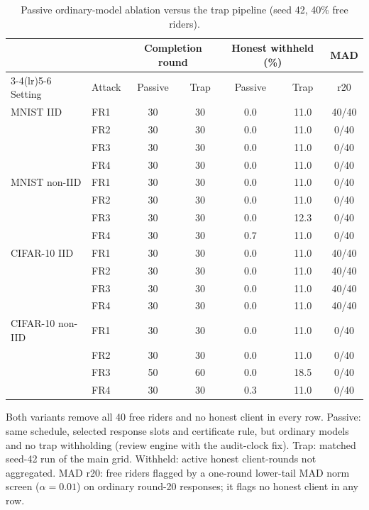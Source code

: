 \documentclass[journal]{IEEEtran}
\begin{document}
\begin{table}[t]\centering\scriptsize\setlength{\tabcolsep}{3.6pt}
\caption{Passive ordinary-model ablation versus the trap pipeline (seed 42, 40\% free riders).}\label{tab:passive}
\begin{tabular}{llcccc@{\hspace{8pt}}c}\toprule
& & \multicolumn{2}{c}{Completion round} & \multicolumn{2}{c}{Honest withheld (\%)} & MAD \\
\cmidrule(lr){3-4}\cmidrule(lr){5-6}
Setting & Attack & Passive & Trap & Passive & Trap & r20 \\ \midrule
MNIST IID & FR1 & 30 & 30 & 0.0 & 11.0 & 40/40 \\
 & FR2 & 30 & 30 & 0.0 & 11.0 & 0/40 \\
 & FR3 & 30 & 30 & 0.0 & 11.0 & 0/40 \\
 & FR4 & 30 & 30 & 0.0 & 11.0 & 0/40 \\
\midrule
MNIST non-IID & FR1 & 30 & 30 & 0.0 & 11.0 & 0/40 \\
 & FR2 & 30 & 30 & 0.0 & 11.0 & 0/40 \\
 & FR3 & 30 & 30 & 0.0 & 12.3 & 0/40 \\
 & FR4 & 30 & 30 & 0.7 & 11.0 & 0/40 \\
\midrule
CIFAR-10 IID & FR1 & 30 & 30 & 0.0 & 11.0 & 40/40 \\
 & FR2 & 30 & 30 & 0.0 & 11.0 & 40/40 \\
 & FR3 & 30 & 30 & 0.0 & 11.0 & 40/40 \\
 & FR4 & 30 & 30 & 0.0 & 11.0 & 40/40 \\
\midrule
CIFAR-10 non-IID & FR1 & 30 & 30 & 0.0 & 11.0 & 0/40 \\
 & FR2 & 30 & 30 & 0.0 & 11.0 & 0/40 \\
 & FR3 & 50 & 60 & 0.0 & 18.5 & 0/40 \\
 & FR4 & 30 & 30 & 0.3 & 11.0 & 0/40 \\
\bottomrule
\end{tabular}
\par\smallskip\parbox{\columnwidth}{\scriptsize Both variants remove all 40 free riders and no honest client in every row. Passive: same schedule, selected response slots and certificate rule, but ordinary models and no trap withholding (review engine with the audit-clock fix). Trap: matched seed-42 run of the main grid. Withheld: active honest client-rounds not aggregated. MAD r20: free riders flagged by a one-round lower-tail MAD norm screen ($\alpha=0.01$) on ordinary round-20 responses; it flags no honest client in any row.}
\end{table}
\end{document}

